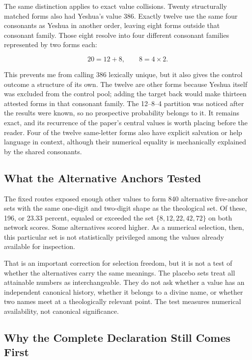 The same distinction applies to exact value collisions. Twenty structurally matched forms also had Yeshua's value 386. Exactly twelve use the same four consonants as Yeshua in another order, leaving eight forms outside that consonant family. Those eight resolve into four different consonant families represented by two forms each:

\[
20=12+8,
\qquad
8=4\times2.
\]

This prevents me from calling 386 lexically unique, but it also gives the control outcome a structure of its own. The twelve are other forms because Yeshua itself was excluded from the control pool; adding the target back would make thirteen attested forms in that consonant family. The 12--8--4 partition was noticed after the results were known, so no prospective probability belongs to it. It remains exact, and its recurrence of the paper's central values is worth placing before the reader. Four of the twelve same-letter forms also have explicit salvation or help language in context, although their numerical equality is mechanically explained by the shared consonants.

\subsection{What the Alternative Anchors Tested}

The fixed routes exposed enough other values to form 840 alternative five-anchor sets with the same one-digit and two-digit shape as the theological set. Of these, 196, or 23.33 percent, equaled or exceeded the set $\{8,12,22,42,72\}$ on both network scores. Some alternatives scored higher. As a numerical selection, then, this particular set is not statistically privileged among the values already available for inspection.

That is an important correction for selection freedom, but it is not a test of whether the alternatives carry the same meanings. The placebo sets treat all attainable numbers as interchangeable. They do not ask whether a value has an independent canonical history, whether it belongs to a divine name, or whether two names meet at a theologically relevant point. The test measures numerical availability, not canonical significance.

\subsection{Why the Complete Declaration Still Comes First}

